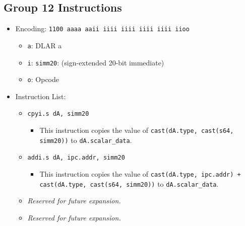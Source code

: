 \documentclass{article}
\begin{document}
	\subsection{Group 12 Instructions}
		\begin{itemize}
		\item Encoding: \texttt{1100 aaaa aaii iiii  iiii iiii iiii iioo}
			\begin{itemize}
			\item \texttt{a}: DLAR a
			\item \texttt{i}: \texttt{simm20}: (sign-extended 20-bit
				immediate)
			\item \texttt{o}: Opcode
			\end{itemize}
		\item Instruction List:
			\begin{itemize}
			\item \texttt{cpyi.s dA, simm20}
				\begin{itemize}
				\item This instruction copies the value of
					\texttt{cast(dA.type, cast(s64, simm20))} to
					\texttt{dA.scalar\_data}.
				\end{itemize}
			\item \texttt{addi.s dA, ipc.addr, simm20}
				\begin{itemize}
				\item This instruction copies the value of
					\texttt{cast(dA.type, ipc.addr)
						+ cast(dA.type, cast(s64, simm20))} to
					\texttt{dA.scalar\_data}.
				\end{itemize}
			\item \textit{Reserved for future expansion.}
			\item \textit{Reserved for future expansion.}
			\end{itemize}
		\end{itemize}
\end{document}
